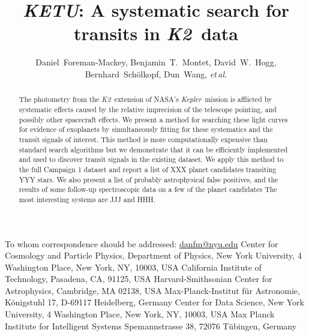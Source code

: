 \documentclass[12pt,preprint]{aastex}
\newcommand{\project}[1]{\emph{#1}}
\newcommand{\kepler}{\project{Kepler}}
\newcommand{\KT}{\project{K2}}
\newcommand{\projectname}{\project{KETU}}
\newcommand{\foreign}[1]{\emph{#1}}
\newcommand{\etal}{\foreign{et\,al.}}
\begin{document}
\title{%
    \projectname:
    A systematic search for transits in \KT\ data
}

\newcommand{\nyu}{2}
\newcommand{\caltech}{3}
\newcommand{\cfa}{4}
\newcommand{\mpia}{5}
\newcommand{\cds}{6}
\newcommand{\mpis}{7}
\author{%
    Daniel~Foreman-Mackey\altaffilmark{1,\nyu},
    Benjamin~T.~Montet\altaffilmark{\caltech,\cfa},
    David~W.~Hogg\altaffilmark{\nyu,\mpia,\cds},
    Bernhard~Sch\"olkopf\altaffilmark{\mpis},
    Dun~Wang\altaffilmark{\nyu},
    \etal
}
         {To whom correspondence should be addressed:
                          \url{danfm@nyu.edu}}
\altaffiltext{\nyu}      {Center for Cosmology and Particle Physics,
                          Department of Physics, New York University,
                          4 Washington Place, New York, NY, 10003, USA}
\altaffiltext{\caltech}  {California Institute of Technology, Pasadena, CA,
                          91125, USA}
\altaffiltext{\cfa}      {Harvard-Smithsonian Center for Astrophysics,
                          Cambridge, MA 02138, USA}
\altaffiltext{\mpia}     {Max-Planck-Institut f\"ur Astronomie,
                          K\"onigstuhl 17, D-69117 Heidelberg, Germany}
\altaffiltext{\cds}      {Center for Data Science,
                          New York University,
                          4 Washington Place, New York, NY, 10003, USA}
\altaffiltext{\mpis}     {Max Planck Institute for Intelligent Systems
                          Spemannstrasse 38, 72076 T\"ubingen, Germany}

\begin{abstract}

The photometry from the \KT\ extension of NASA's \kepler\ mission is
afflicted by systematic effects caused by the relative imprecision of the
telescope pointing, and possibly other spacecraft effects.
We present a method for searching these light curves for evidence of
exoplanets by simultaneously fitting for these systematics and the
transit signals of interest.
This method is more computationally expensive than standard search algorithms
but we demonstrate that it can be efficiently implemented and used to
discover transit signals in the existing dataset.
We apply this method to the full Campaign 1 dataset and report a list of XXX
planet candidates transiting YYY stars.
We also present a list of probably astrophysical false positives, and
the results of some follow-up spectroscopic data on a few of the
planet candidates
The most interesting systems are JJJ and HHH.

\end{abstract}
\end{document}
